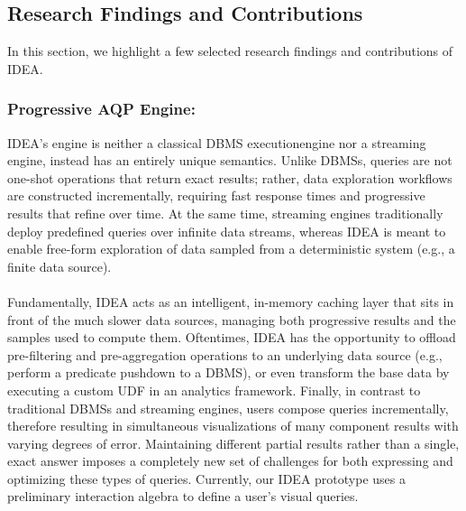 \documentclass[12pt,letterpaper, onecolumn]{exam}
\begin{document}
    \subsection{Research Findings and Contributions}
    In this section, we highlight a few selected research findings and contributions of IDEA.
    
    \subsubsection{Progressive AQP Engine:} 
    IDEA’s engine is neither a classical DBMS executionengine nor a streaming engine, instead has an entirely unique semantics. Unlike DBMSs, queries are not one-shot operations that return exact results; rather, data exploration workflows are constructed incrementally, requiring fast response times and progressive results that refine over time. At the same time, streaming engines traditionally deploy predefined queries over infinite data streams, whereas IDEA is meant to enable free-form exploration of data sampled from a deterministic system (e.g., a finite data source).\\
    \\
    Fundamentally, IDEA acts as an intelligent, in-memory caching layer that sits in front of the much slower data sources, managing both progressive results and the samples used to compute them. Oftentimes, IDEA has the opportunity to offload pre-filtering and pre-aggregation operations to an underlying data source (e.g., perform a predicate pushdown to a DBMS), or even transform the base data by executing a custom UDF in an analytics framework. Finally, in contrast to traditional DBMSs and streaming engines, users compose queries incrementally, therefore resulting in simultaneous visualizations of many component results with varying degrees of error. Maintaining different partial results rather than a single, exact answer imposes a completely new set of challenges for both expressing and optimizing these types of queries. Currently, our IDEA prototype uses a preliminary interaction algebra to define a user’s visual queries.
    
\end{document}
